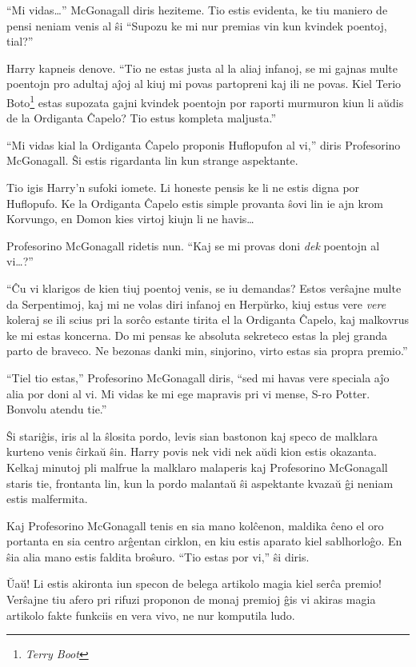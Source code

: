 ``Mi vidas\ldots'' McGonagall diris heziteme. Tio estis evidenta, ke
tiu maniero de pensi neniam venis al ŝi ``Supozu ke mi nur premias vin
kun kvindek poentoj, tial?''

Harry kapneis denove. ``Tio ne estas justa al la aliaj infanoj, se mi
gajnas multe poentojn pro adultaj aĵoj al kiuj mi povas partopreni kaj
ili ne povas. Kiel Terio Boto\footnote{\emph{Terry Boot}} estas
supozata gajni kvindek poentojn por raporti murmuron kiun li aŭdis de
la Ordiganta Ĉapelo? Tio estus kompleta maljusta.''

``Mi vidas kial la Ordiganta Ĉapelo proponis Huflopufon al vi,'' diris
Profesorino McGonagall. Ŝi estis rigardanta lin kun strange aspektante.

Tio igis Harry'n sufoki iomete. Li honeste pensis ke li ne estis digna
por Huflopufo. Ke la Ordiganta Ĉapelo estis simple provanta ŝovi lin
ie ajn krom Korvungo, en Domon kies virtoj kiujn li ne havis\ldots

Profesorino McGonagall ridetis nun. ``Kaj se mi provas doni \emph{dek}
poentojn al vi\ldots?''

``Ĉu vi klarigos de kien tiuj poentoj venis, se iu demandas? Estos
verŝajne multe da Serpentimoj, kaj mi ne volas diri infanoj en
Herpŭrko, kiuj estus vere \emph{vere} koleraj se ili scius pri la
sorĉo estante tirita el la Ordiganta Ĉapelo, kaj malkovrus ke mi estas
koncerna. Do mi pensas ke absoluta sekreteco estas la plej granda
parto de braveco. Ne bezonas danki min, sinjorino, virto estas sia
propra premio.''

``Tiel tio estas,'' Profesorino McGonagall diris, ``sed mi havas vere
speciala aĵo alia por doni al vi. Mi vidas ke mi ege mapravis pri vi
mense, S-ro Potter. Bonvolu atendu tie.''

Ŝi stariĝis, iris al la ŝlosita pordo, levis sian bastonon kaj speco
de malklara kurteno venis ĉirkaŭ ŝin. Harry povis nek vidi nek aŭdi kion
estis okazanta. Kelkaj minutoj pli malfrue la malklaro malaperis kaj
Profesorino McGonagall staris tie, frontanta lin, kun la pordo
malantaŭ ŝi aspektante kvazaŭ ĝi neniam estis malfermita.

Kaj Profesorino McGonagall tenis en sia mano kolĉenon, maldika ĉeno el
oro portanta en sia centro arĝentan cirklon, en kiu estis aparato kiel
sablhorloĝo. En ŝia alia mano estis faldita broŝuro. ``Tio estas por
vi,'' ŝi diris.

Ŭaŭ! Li estis akironta iun specon de belega artikolo magia kiel serĉa
premio! Verŝajne tiu afero pri rifuzi proponon de monaj premioj ĝis vi
akiras magia artikolo fakte funkciis en vera vivo, ne nur komputila
ludo.

